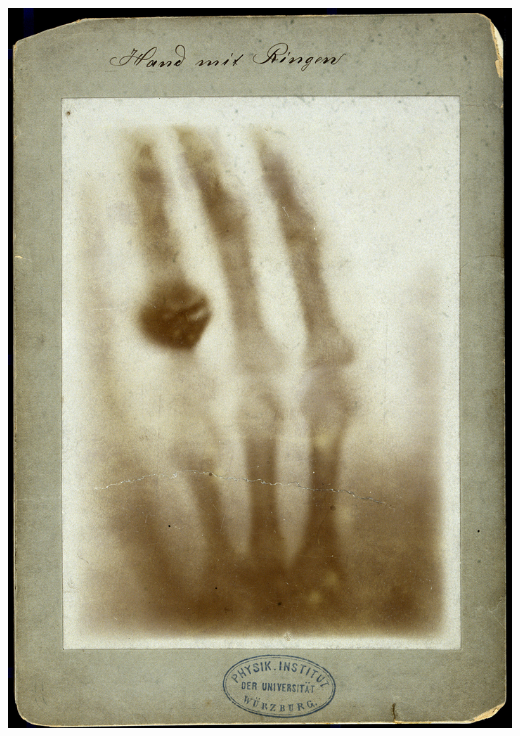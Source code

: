 \documentclass{beamer}
\begin{document}
\begin{frame}
	 \center
	 \includegraphics[scale=0.04]{media/handxray.jpg}
\end{frame}
\end{document}
